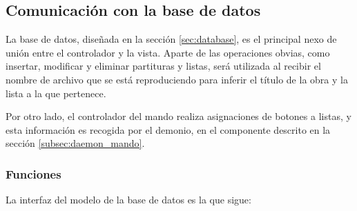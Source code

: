 \subsection{Comunicación con la base de datos}

La base de datos, diseñada en la sección \ref{sec:database}, es el principal nexo de unión entre el controlador y la vista. Aparte de las operaciones obvias, como insertar, modificar y eliminar partituras y listas, será utilizada al recibir el nombre de archivo que se está reproduciendo para inferir el título de la obra y la lista a la que pertenece.

Por otro lado, el controlador del mando realiza asignaciones de botones a listas, y esta información es recogida por el demonio, en el componente descrito en la sección \ref{subsec:daemon_mando}.

\subsubsection{Funciones}

La interfaz del modelo de la base de datos es la que sigue:

